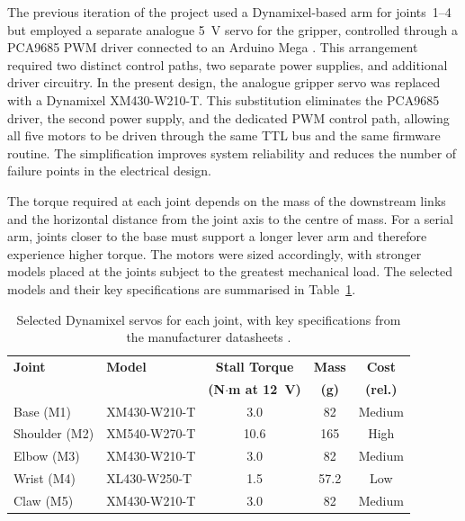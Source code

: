 The previous iteration of the project used a Dynamixel-based arm 
for joints~1--4 but employed a separate analogue 5~V servo for 
the gripper, controlled through a PCA9685 PWM driver connected to 
an Arduino Mega \cite{sortify}. This arrangement required two 
distinct control paths, two separate power supplies, and 
additional driver circuitry. In the present design, the analogue 
gripper servo was replaced with a Dynamixel XM430-W210-T. This 
substitution eliminates the PCA9685 driver, the second power 
supply, and the dedicated PWM control path, allowing all five 
motors to be driven through the same TTL bus and the same firmware 
routine. The simplification improves system reliability and 
reduces the number of failure points in the electrical design.

The torque required at each joint depends on the mass of the 
downstream links and the horizontal distance from the joint axis 
to the centre of mass. For a serial arm, joints closer to the 
base must support a longer lever arm and therefore experience 
higher torque. The motors were sized accordingly, with stronger 
models placed at the joints subject to the greatest mechanical 
load. The selected models and their key specifications are 
summarised in Table~\ref{tab:motor_selection}.

\begin{table}[htbp]
    \centering
    \renewcommand{\arraystretch}{1.3}
    \begin{tabular}{|l|l|c|c|c|}
        \hline
        \textbf{Joint} & \textbf{Model} & 
        \textbf{Stall Torque} & 
        \textbf{Mass} &
        \textbf{Cost} \\
         & & \textbf{(N$\cdot$m at 12~V)} & \textbf{(g)} & \textbf{(rel.)} \\
        \hline
        Base (M1)     & XM430-W210-T & 3.0 & 82  & Medium \\
        \hline
        Shoulder (M2) & XM540-W270-T & 10.6 & 165 & High \\
        \hline
        Elbow (M3)    & XM430-W210-T & 3.0 & 82  & Medium \\
        \hline
        Wrist (M4)    & XL430-W250-T & 1.5 & 57.2 & Low \\
        \hline
        Claw (M5)     & XM430-W210-T & 3.0 & 82  & Medium \\
        \hline
    \end{tabular}
    \caption{Selected Dynamixel servos for each joint, with key 
    specifications from the manufacturer datasheets 
    \cite{robotis_dynamixel}.}
    \label{tab:motor_selection}
\end{table}

